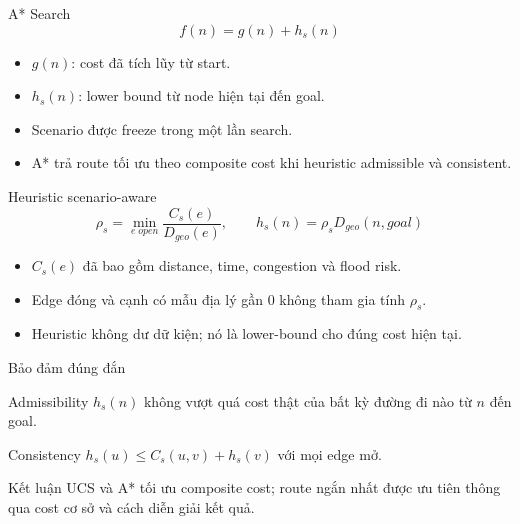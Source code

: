 \documentclass[aspectratio=169,11pt]{beamer}
\begin{document}
\begin{frame}{A* Search}
\begin{equation*}
f(n)=g(n)+h_s(n)
\end{equation*}
\begin{itemize}
  \item $g(n)$: cost đã tích lũy từ start.
  \item $h_s(n)$: lower bound từ node hiện tại đến goal.
  \item Scenario được freeze trong một lần search.
  \item A* trả route tối ưu theo composite cost khi heuristic admissible và consistent.
\end{itemize}
\end{frame}

\begin{frame}{Heuristic scenario-aware}
\begin{equation*}
\rho_s=\min_{e\;open}\frac{C_s(e)}{D_{geo}(e)},
\qquad h_s(n)=\rho_sD_{geo}(n,goal)
\end{equation*}
\begin{itemize}
  \item $C_s(e)$ đã bao gồm distance, time, congestion và flood risk.
  \item Edge đóng và cạnh có mẫu địa lý gần 0 không tham gia tính $\rho_s$.
  \item Heuristic không dư dữ kiện; nó là lower-bound cho đúng cost hiện tại.
\end{itemize}
\end{frame}

\begin{frame}{Bảo đảm đúng đắn}
\begin{block}{Admissibility}
$h_s(n)$ không vượt quá cost thật của bất kỳ đường đi nào từ $n$ đến goal.
\end{block}
\begin{block}{Consistency}
$h_s(u)\le C_s(u,v)+h_s(v)$ với mọi edge mở.
\end{block}
\begin{alertblock}{Kết luận}
UCS và A* tối ưu composite cost; route ngắn nhất được ưu tiên thông qua cost cơ sở và cách diễn giải kết quả.
\end{alertblock}
\end{frame}
\end{document}
